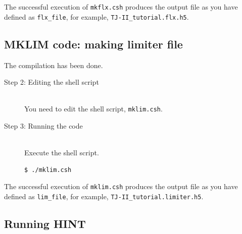 \documentclass[10pt]{ltxdoc} %
\begin{document}
The successful execution of \texttt{mkflx.csh} produces the output file as you have defined as \texttt{flx\_file}, for example, \texttt{TJ-II\_tutorial.flx.h5}. 


\subsection{MKLIM code: making limiter file}
The compilation has been done. 
\begin{description}

  
 \item[Step 2: Editing the shell script]\mbox{}\\
  You need to edit the shell script, \texttt{mklim.csh}. 
  
 \item[Step 3: Running the code]\mbox{}\\
  Execute the shell script.
\vspace{-2mm}
\begin{verbatim}
$ ./mklim.csh
\end{verbatim}
\vspace{-2mm}
\end{description}

The successful execution of \texttt{mklim.csh} produces the output file as you have defined as \texttt{lim\_file}, for example, \texttt{TJ-II\_tutorial.limiter.h5}. 
  


\subsection{Running HINT}
\end{document}
